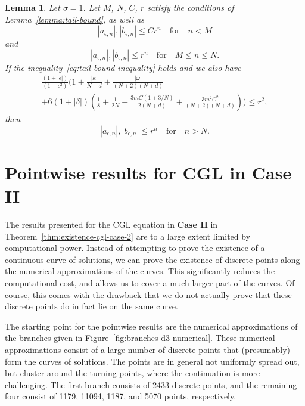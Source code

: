\documentclass[11pt]{article}
\newtheorem{lemma}[definition]{Lemma}
\begin{document}
\begin{lemma}\label{lemma:tail-bound-depsilon}
  Let \(\sigma = 1\). Let \(M\), \(N\), \(C\), \(r\) satisfy the
  conditions of Lemma~\ref{lemma:tail-bound}, as well as
  \begin{equation*}
    |a_{\epsilon,n}|, |b_{\epsilon,n}| \leq C r^{n} \quad\text{for}\quad n < M
  \end{equation*}
  and
  \begin{equation*}
    |a_{\epsilon,n}|, |b_{\epsilon,n}| \leq r^{n} \quad\text{for}\quad M \leq n \leq N.
  \end{equation*}
  If the inequality~\eqref{eq:tail-bound-inequality} holds and we also
  have
  \begin{multline}
    \label{eq:tail-bound-inequality-depsilon}
    \frac{(1 + |\epsilon|)}{(1 + \epsilon^{2})}\Bigg(
    1 +
    \frac{|\kappa|}{N + d}
    + \frac{|\omega|}{(N + 2)(N + d)}\\
    + 6(1 + |\delta|)\left(
      \frac{1}{8} + \frac{1}{2N}
      + \frac{3mC(1 + 3/N)}{2(N + d)}
      + \frac{3m^{2}C^{2}}{(N + 2)(N + d)}
    \right)
    \Bigg) \leq r^2,
  \end{multline}
  then
  \begin{equation*}
    |a_{\epsilon,n}|, |b_{\epsilon,n}| \leq r^{n} \quad\text{for}\quad n > N.
  \end{equation*}
\end{lemma}

\section{Pointwise results for CGL in Case II}
\label{sec:pointwise-results-cgl}
The results presented for the CGL equation in \textbf{Case II} in
Theorem~\ref{thm:existence-cgl-case-2} are to a large extent limited
by computational power. Instead of attempting to prove the existence
of a continuous curve of solutions, we can prove the existence of
discrete points along the numerical approximations of the curves. This
significantly reduces the computational cost, and allows us to cover a
much larger part of the curves. Of course, this comes with the drawback that we
do not actually prove that these discrete points do in fact lie on the
same curve.

The starting point for the pointwise results are the numerical
approximations of the branches given in
Figure~\ref{fig:branches-d3-numerical}. These numerical approximations
consist of a large number of discrete points that (presumably) form
the curves of solutions. The points are in general not uniformly
spread out, but cluster around the turning points, where the
continuation is more challenging. The first branch consists of 2433
discrete points, and the remaining four consist of 1179, 11094, 1187,
and 5070 points, respectively.
\end{document}
